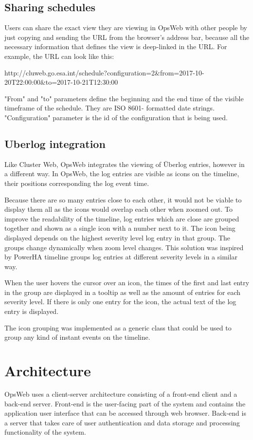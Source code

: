 \subsection{Sharing schedules}
Users can share the exact view they are viewing in OpsWeb with other people by just copying and sending the URL from the browser's address bar, because all the necessary information that defines the view is deep-linked in the URL. For example, the URL can look like this:

http://cluweb.go.esa.int/schedule?configuration=2\&from=2017-10-20T22:00:00\&to=2017-10-21T12:30:00

"From" and "to" parameters define the beginning and the end time of the visible timeframe of the schedule. They are ISO 8601- formatted date strings. "Configuration" parameter is the id of the configuration that is being used.

\subsection{Uberlog integration}
Like Cluster Web, OpsWeb integrates the viewing of Überlog entries, however in a different way. In OpsWeb, the log entries are visible as icons on the timeline, their positions corresponding the log event time. 

Because there are so many entries close to each other, it would not be viable to display them all as the icons would overlap each other when zoomed out. To improve the readability of the timeline, log entries which are close are grouped together and shown as a single icon with a number next to it. The icon being displayed depends on the highest severity level log entry in that group. The groups change dynamically when zoom level changes. This solution was inspired by PowerHA timeline groups log entries at different severity levels in a similar way. \cite{ibm_timeline}

When the user hovers the cursor over an icon, the times of the first and last entry in the group are displayed in a tooltip as well as the amount of entries for each severity level. If there is only one entry for the icon, the actual text of the log entry is displayed.

The icon grouping was implemented as a generic class that could be used to group any kind of instant events on the timeline.
\section{Architecture}
OpsWeb uses a client-server architecture consisting of a front-end client and a back-end server. Front-end is the user-facing part of the system and contains the application user interface that can be accessed through web browser. Back-end is a server that takes care of user authentication and data storage and processing functionality of the system.
